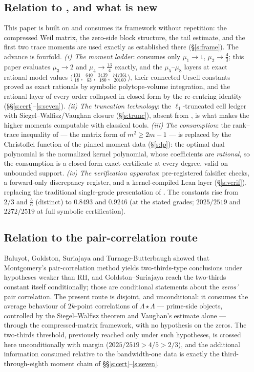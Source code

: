 \documentclass[11pt]{article}
\numberwithin{equation}{section}
\theoremstyle{definition}
\theoremstyle{remark}
\newcommand{\LL}{\Lambda}
\begin{document}
\subsection*{Relation to \cite{C26}, and what is new}

This paper is built on \cite{C26} and consumes its framework
without repetition: the compressed Weil matrix, the zero-side
block structure, the tail estimate, and the first two trace
moments are used exactly as established there
(\S\ref{s:frame}). The advance is fourfold. \emph{(i) The
moment ladder}: \cite{C26} consumes only
$\mu_1\to1$, $\mu_2\to\tfrac43$; this paper evaluates
$\mu_3\to2$ and $\mu_4\to\tfrac{13}4$ exactly, and the
$\mu_5$--$\mu_8$ layers at exact rational model values
($\tfrac{101}{18}$, $\tfrac{640}{63}$, $\tfrac{3439}{180}$,
$\tfrac{747361}{20160}$), their
connected Ursell constants proved as exact rationals by
symbolic polytope-volume integration, and the rational layer
of every order collapsed in closed form by the re-centring
identity (\S\S\ref{s:cert}--\ref{s:seven}). \emph{(ii)
The truncation technology}: the $\ell_1$-truncated cell ledger
with Siegel--Walfisz/Vaughan closure (\S\ref{s:trunc}), absent
from \cite{C26}, is what makes the higher moments computable
with classical tools. \emph{(iii) The consumption}: the
rank--trace inequality of \cite[Lem.~3.2]{C26} --- the matrix
form of $m^{2}\ge2m-1$ --- is replaced by the Christoffel
function of the pinned moment data
(\S\ref{s:lp}): the optimal dual polynomial is the normalized
kernel polynomial, whose coefficients are \emph{rational}, so
the consumption is a closed-form exact certificate at every
degree, valid on unbounded support.
\emph{(iv) The verification apparatus}: pre-registered
falsifier checks, a forward-only discrepancy register, and a
kernel-compiled Lean layer (\S\ref{s:verif}), replacing the
traditional single-grade presentation of \cite{C26}. The
constants rise from $2/3$ and $\tfrac56$ (distinct) to
$0.8493$ and $0.9246$ (at the stated grades; $2025/2519$ and
$2272/2519$ at full symbolic certification).

\subsection*{Relation to the pair-correlation route}

Baluyot, Goldston, Suriajaya and Turnage-Butterbaugh \cite{BGST}
showed that Montgomery's pair-correlation method yields
two-thirds-type conclusions under hypotheses weaker than RH, and
Goldston--Suriajaya \cite{GS} reach the two-thirds constant
itself conditionally; those are conditional statements about the
\emph{zeros'} pair correlation. The present route is disjoint,
and unconditional: it consumes the average behaviour of
$2k$-point correlations of $\LL\star\LL$ --- prime-side
objects, controlled by the Siegel--Walfisz theorem and Vaughan's
estimate alone --- through the compressed-matrix framework, with
no hypothesis on the zeros. The two-thirds threshold, previously
reached only under such hypotheses, is crossed here
unconditionally with margin ($2025/2519>4/5>2/3$), and the
additional
information consumed relative to the bandwidth-one data is
exactly the third-through-eighth moment chain of
\S\S\ref{s:cert}--\ref{s:seven}.
\end{document}
